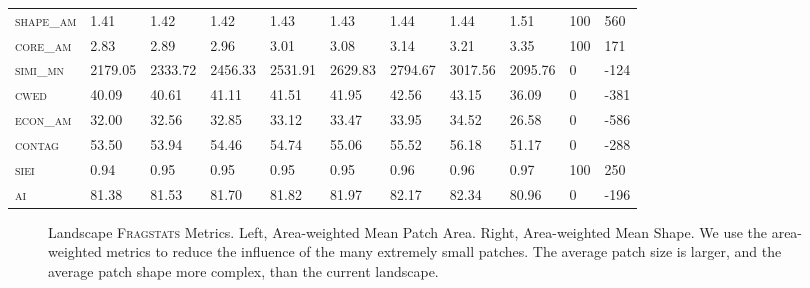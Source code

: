 \begin{landscape}
\begin{table}[!htbp]
\begin{tabular}{@{}llllllll|lll@{}}
\small \textsc{shape\_am}       & 1.41    & 1.42    & 1.42    & 1.43    & 1.43     & 1.44    & 1.44      & 1.51                & 100      & 560  \\
\small \textsc{core\_am}        & 2.83    & 2.89    & 2.96    & 3.01    & 3.08     & 3.14    & 3.21      & 3.35                & 100      & 171  \\
\small \textsc{simi\_mn}        & 2179.05 & 2333.72 & 2456.33 & 2531.91 & 2629.83  & 2794.67 & 3017.56   & 2095.76             & 0        & -124 \\
\small \textsc{cwed}            & 40.09   & 40.61   & 41.11   & 41.51   & 41.95    & 42.56   & 43.15     & 36.09               & 0        & -381 \\
\small \textsc{econ\_am}        & 32.00   & 32.56   & 32.85   & 33.12   & 33.47    & 33.95   & 34.52     & 26.58               & 0        & -586 \\
\small \textsc{contag}          & 53.50   & 53.94   & 54.46   & 54.74   & 55.06    & 55.52   & 56.18     & 51.17               & 0        & -288 \\
\small \textsc{siei}            & 0.94    & 0.95    & 0.95    & 0.95    & 0.95     & 0.96    & 0.96      & 0.97                & 100      & 250  \\
\small \textsc{ai}              & 81.38   & 81.53   & 81.70   & 81.82   & 81.97    & 82.17   & 82.34     & 80.96               & 0        & -196 \\ \bottomrule
\end{tabular}
\end{table}
\end{landscape}

\clearpage
\begin{figure}[!htbp]
  \centering
\caption{Landscape \textsc{Fragstats} Metrics. Left, Area-weighted Mean Patch Area. Right, Area-weighted Mean Shape. We use the area-weighted metrics to reduce the influence of the many extremely small patches. The average patch size is larger, and the average patch shape more complex, than the current landscape.} 
\label{fig:fragland_areashape}
\end{figure}

